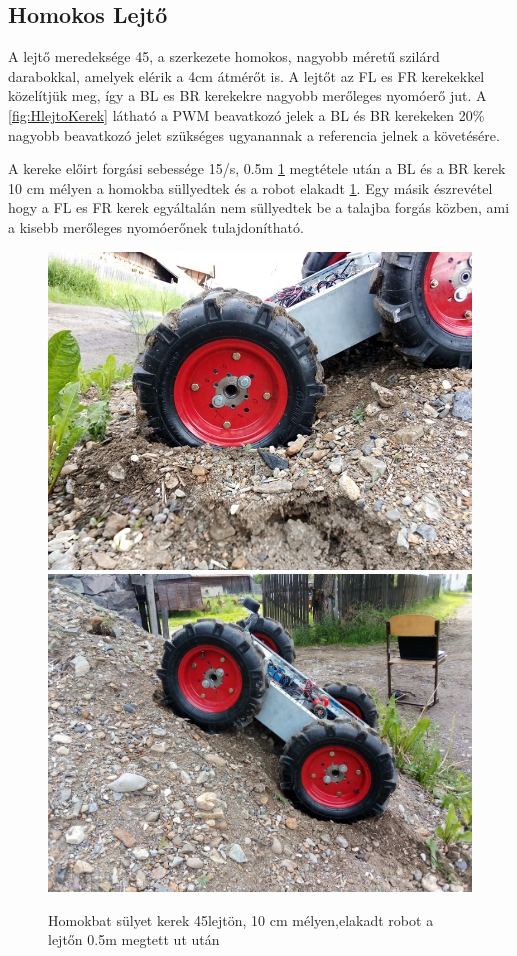 \subsection{Homokos Lejtő}


\renewcommand{\GlobalPath}{Meresek/Mozgasok/HomokosDomb/}
\renewcommand{\secondImage}{*}

A lejtő meredeksége 45\degree, a szerkezete homokos, nagyobb méretű szilárd darabokkal, amelyek elérik a 4cm átmérőt is.
A lejtőt az FL es FR kerekekkel közelítjük meg, így a BL es BR kerekekre nagyobb merőleges nyomóerő jut.
A \ref{fig:HlejtoKerek} látható a PWM beavatkozó jelek a BL és BR kerekeken 20\% nagyobb beavatkozó jelet szükséges ugyanannak a referencia jelnek a követésére.

A kereke előirt forgási sebessége 15\degree/s, 0.5m \ref{fig:Hlejto1}  megtétele után a BL és a BR kerek 10 cm mélyen a homokba süllyedtek és a robot elakadt \ref{fig:Hlejto1}. Egy másik észrevétel hogy a FL es FR kerek egyáltalán nem süllyedtek be a talajba forgás közben, ami a kisebb merőleges nyomóerőnek tulajdonítható. 

%

%



\begin{figure}
\includegraphics[width=.5\linewidth]{Meresek/Mozgasok/HomokosDomb/kep1.jpg}\hfill
\includegraphics[width=.5\linewidth]{Meresek/Mozgasok/HomokosDomb/kep2.jpg}
\caption{Homokbat sülyet kerek 45\degree lejtön, 10 cm mélyen,elakadt robot a lejtőn 0.5m megtett ut után}
\label{fig:Hlejto1}
\end{figure}






